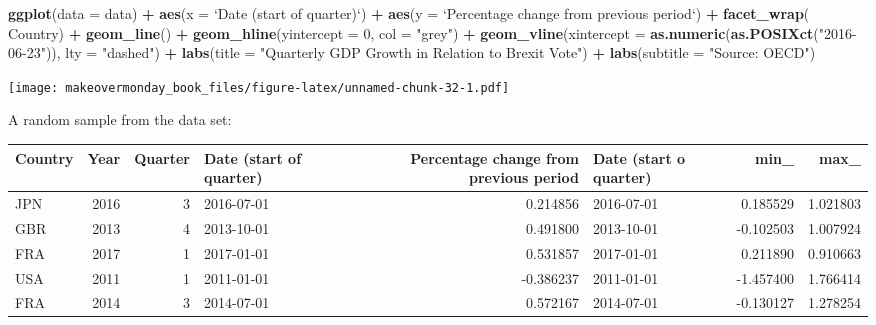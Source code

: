 \documentclass[]{book}
\newenvironment{Shaded}{\begin{snugshade}}{\end{snugshade}}
\newcommand{\KeywordTok}[1]{\textcolor[rgb]{0.13,0.29,0.53}{\textbf{#1}}}
\newcommand{\DataTypeTok}[1]{\textcolor[rgb]{0.13,0.29,0.53}{#1}}
\newcommand{\DecValTok}[1]{\textcolor[rgb]{0.00,0.00,0.81}{#1}}
\newcommand{\StringTok}[1]{\textcolor[rgb]{0.31,0.60,0.02}{#1}}
\newcommand{\OperatorTok}[1]{\textcolor[rgb]{0.81,0.36,0.00}{\textbf{#1}}}
\newcommand{\NormalTok}[1]{#1}
\theoremstyle{definition}
\theoremstyle{definition}
\theoremstyle{definition}
\theoremstyle{remark}
\begin{document}
\begin{Shaded}
\begin{Highlighting}[]
\KeywordTok{ggplot}\NormalTok{(}\DataTypeTok{data =}\NormalTok{ data) }\OperatorTok{+}
\StringTok{  }\KeywordTok{aes}\NormalTok{(}\DataTypeTok{x =} \StringTok{`}\DataTypeTok{Date (start of quarter)}\StringTok{`}\NormalTok{) }\OperatorTok{+}
\StringTok{  }\KeywordTok{aes}\NormalTok{(}\DataTypeTok{y =} \StringTok{`}\DataTypeTok{Percentage change from previous period}\StringTok{`}\NormalTok{) }\OperatorTok{+}
\StringTok{  }\KeywordTok{facet_wrap}\NormalTok{(}\OperatorTok{~}\StringTok{ }\NormalTok{Country) }\OperatorTok{+}
\StringTok{  }\KeywordTok{geom_line}\NormalTok{() }\OperatorTok{+}
\StringTok{  }\KeywordTok{geom_hline}\NormalTok{(}\DataTypeTok{yintercept =} \DecValTok{0}\NormalTok{, }\DataTypeTok{col =} \StringTok{"grey"}\NormalTok{) }\OperatorTok{+}
\StringTok{  }\KeywordTok{geom_vline}\NormalTok{(}\DataTypeTok{xintercept =} \KeywordTok{as.numeric}\NormalTok{(}\KeywordTok{as.POSIXct}\NormalTok{(}\StringTok{"2016-06-23"}\NormalTok{)), }\DataTypeTok{lty =} \StringTok{"dashed"}\NormalTok{) }\OperatorTok{+}
\StringTok{  }\KeywordTok{labs}\NormalTok{(}\DataTypeTok{title =} \StringTok{"Quarterly GDP Growth in Relation to Brexit Vote"}\NormalTok{) }\OperatorTok{+}
\StringTok{  }\KeywordTok{labs}\NormalTok{(}\DataTypeTok{subtitle =} \StringTok{"Source: OECD"}\NormalTok{)}
\end{Highlighting}
\end{Shaded}

\texttt{[image: makeovermonday\_book\_files/figure-latex/unnamed-chunk-32-1.pdf]}

A random sample from the data set:

\begin{tabular}{l|r|r|l|r|l|r|r}
\hline
Country & Year & Quarter & Date (start of quarter) & Percentage change from previous period & Date (start o quarter) & min\_ & max\_\\
\hline
JPN & 2016 & 3 & 2016-07-01 & 0.214856 & 2016-07-01 & 0.185529 & 1.021803\\
\hline
GBR & 2013 & 4 & 2013-10-01 & 0.491800 & 2013-10-01 & -0.102503 & 1.007924\\
\hline
FRA & 2017 & 1 & 2017-01-01 & 0.531857 & 2017-01-01 & 0.211890 & 0.910663\\
\hline
USA & 2011 & 1 & 2011-01-01 & -0.386237 & 2011-01-01 & -1.457400 & 1.766414\\
\hline
FRA & 2014 & 3 & 2014-07-01 & 0.572167 & 2014-07-01 & -0.130127 & 1.278254\\
\hline
\end{tabular}
\end{document}
